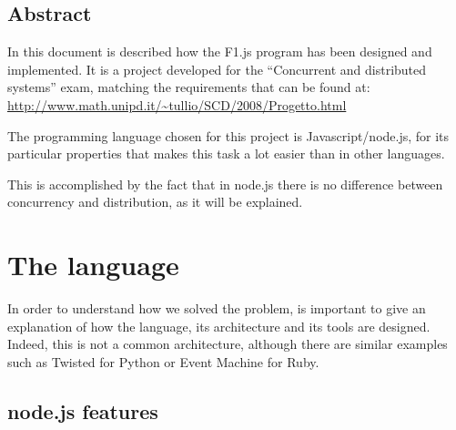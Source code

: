 
\def\PROJECT			{F1.js} %
\def\AUTHOR			{\ME}
\def\REPOurl		{https://github.com/filnik/F1.js}

\def\TABLES		{false} %
\def\FIGURES	{true} %



\newpage


\newpage

\begin{center}
\section*{Abstract}
\end{center}
In this document is described how the F1.js program has been designed and implemented. It is a project developed for the ``Concurrent and distributed systems'' exam, matching the requirements that can be found at: \url{http://www.math.unipd.it/~tullio/SCD/2008/Progetto.html}

 The programming language chosen for this project is Javascript/node.js, for its particular properties that makes this task a lot easier than in other languages.

This is accomplished by the fact that in node.js there is no difference between concurrency and distribution, as it will be explained.

\newpage
\section{The language}
In order to understand how we solved the problem, is important to give an explanation of how the language, its architecture and its tools are designed. Indeed, this is not a common architecture, although there are similar examples such as Twisted for Python or Event Machine for Ruby.

\subsection{node.js features}

